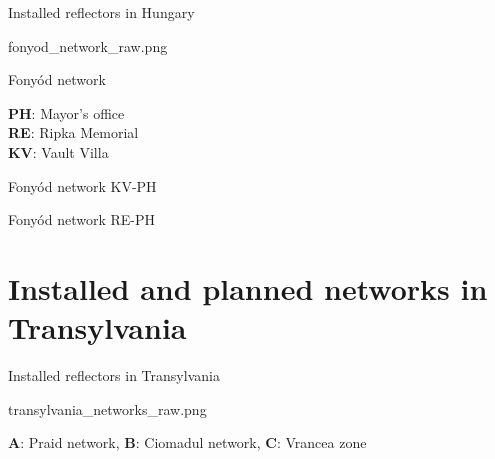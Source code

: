 \documentclass{beamer}
\begin{document}
\begin{frame}{Installed reflectors in Hungary}
    \begin{minipage}[c]{0.6\textwidth}
        \centering
        \begin{anfig}{fonyod_network_raw.png}
        \end{anfig}

        Fonyód network
    \end{minipage}
    \hspace{5pt}
    \begin{minipage}[c]{0.3\textwidth}
            \textbf{PH}: Mayor's office\\
            \textbf{RE}: Ripka Memorial\\
            \textbf{KV}: Vault Villa
    \end{minipage}
\end{frame}



\begin{frame}{Fonyód network KV-PH}
\end{frame}

\begin{frame}{Fonyód network RE-PH}
\end{frame}



\section{Installed and planned networks in Transylvania}


\begin{frame}{Installed reflectors in Transylvania}
    \begin{minipage}[c]{0.95\textwidth}
        \centering
        \begin{anfig}{transylvania_networks_raw.png}
        \end{anfig}
            \textbf{A}: Praid network, 
            \textbf{B}: Ciomadul network, 
            \textbf{C}: Vrancea zone
    \end{minipage}
\end{frame}
\end{document}
